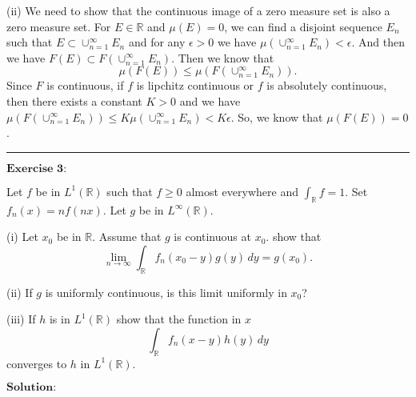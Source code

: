 \documentclass[12pt]{article}
\begin{document}
(ii) We need to show that the continuous image of a zero measure set is also a zero measure set. For $E \in \mathbb{R}$ and $\mu(E) = 0$, we can find a disjoint sequence ${E_{n}}$ such that $E \subset \cup_{n=1}^{\infty} E_{n}$ and for any $\epsilon > 0$ we have $\mu(\cup_{n=1}^{\infty} E_{n}) < \epsilon$. And then we have $F(E) \subset F(\cup_{n=1}^{\infty} E_{n}) $. Then we know that
\begin{equation*}
    \mu(F(E)) \leq \mu(F(\cup_{n=1}^{\infty} E_{n})) .
\end{equation*}
Since $F$ is continuous, if $f$ is lipchitz continuous or $f$ is absolutely continuous, then there exists a constant $K > 0$ and we have $\mu(F(\cup_{n=1}^{\infty} E_{n}))  \leq K \mu(\cup_{n=1}^{\infty} E_{n}) < K \epsilon$. So, we know that $\mu(F(E)) = 0$.
 
\noindent\rule[0.25\baselineskip]{\textwidth}{0.5pt}

\vspace{8pt}

$\textbf{Exercise 3:}$

Let $f$ be in $L^{1}(\mathbb{R})$ such that $f \geq 0$ almost everywhere and $\int_{\mathbb{R}}^{} f = 1$. Set $f_{n} (x) = n f(n x)$. Let $g$ be in $L^{\infty}(\mathbb{R})$.

(i) Let $x_{0}$ be in $\mathbb{R}$. Assume that $g$ is continuous at $x_{0}$. show that
\begin{equation*}
   \lim_{n \to \infty} \int_{\mathbb{R}}^{} f_{n}(x_{0} - y) g(y) \, d y = g(x_{0}).
\end{equation*}

(ii) If $g$ is uniformly continuous, is this limit uniformly in $x_{0}$?

(iii) If $h$ is in $L^{1}(\mathbb{R})$ show that the function in $x$
\begin{equation*}
    \int_{\mathbb{R}}^{} f_{n} (x - y) h(y) \, d y
\end{equation*}
converges to $h$ in $L^{1}(\mathbb{R})$.

\vspace{8pt}
$\textbf{Solution:}$
\end{document}
